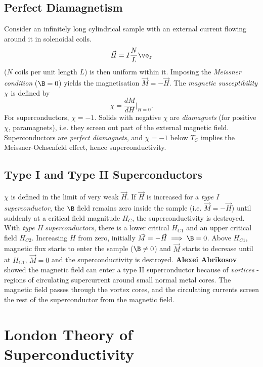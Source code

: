 \documentclass[qo.tex]{subfiles}
\begin{document}
\section{Perfect Diamagnetism}
Consider an infinitely long cylindrical sample with an external current flowing around it in solenoidal coils. 
\begin{equation}
    \vec{H}=I\frac{N}{L}\ve_z
\end{equation}
($N$ coils per unit length $L$) is then uniform within it. 
Imposing the \emph{Meissner condition} ($\B=0$) yields the magnetisation $\vec{M}=-\vec{H}$.
The \emph{magnetic susceptibility} $\chi$ is defined by
\begin{equation}
    \chi = \frac{dM}{dH}\bigg|_{H=0}.
\end{equation}
For superconductors, $\chi=-1$.
Solids with negative $\chi$ are \emph{diamagnets} (for positive $\chi$, paramagnets), i.e. they screen out part of the external magnetic field. 
Superconductors are \emph{perfect diamagnets}, and $\chi=-1$ below $T_C$ implies the Meissner-Ochsenfeld effect, hence superconductivity. 

\section{Type I and Type II Superconductors}
$\chi$ is defined in the limit of very weak $\vec{H}$.
If $\vec{H}$ is increased for a \emph{type I superconductor}, the $\B$ field remains zero inside the sample (i.e. $\vec{M}=-\vec{H}$) until suddenly at a critical field magnitude $H_C$, the superconductivity is destroyed. 
With \emph{type II superconductors}, there is a lower critical $H_{C1}$ and an upper critical field $H_{C2}$. 
Increasing $H$ from zero, initially $\vec{M}=-\vec{H}\implies\B=0$.
Above $H_{C1}$, magnetic flux starts to enter the sample ($\B\neq0$) and $\vec{M}$ starts to decrease until at $H_{C1}$, $\vec{M}=0$ and the superconductivity is destroyed. 
\textbf{Alexei Abrikosov} showed the magnetic field can enter a type II superconductor because of \emph{vortices} - regions of circulating supercurrent around small normal metal cores. 
The magnetic field passes through the vortex cores, and the circulating currents screen the rest of the superconductor from the magnetic field. 

\chapter{London Theory of Superconductivity}
\end{document}
